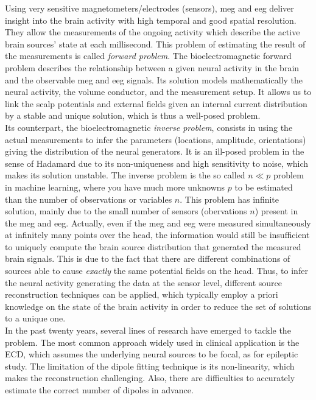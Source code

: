 Using very sensitive magnetometers/electrodes (sensors), \ac{meg} and \ac{eeg} deliver insight into the brain activity with high temporal and good spatial resolution. They allow the measurements of the ongoing activity which describe the active brain sources' state at each millisecond. This problem of estimating the result of the measurements is called \textit{forward problem}. The bioelectromagnetic forward problem describes the relationship between a given neural activity in the brain and the observable \ac{meg} and \ac{eeg} signals. Its solution models mathematically the neural activity, the volume conductor, and the measurement setup. It allows us to link the scalp potentials and external fields given an internal current distribution by a stable and unique solution, which is thus a well-posed problem. \\

Its counterpart, the bioelectromagnetic \textit{inverse problem}, consists in using the actual measurements to infer the parameters (locations, amplitude, orientations) giving the distribution of the neural generators. It is an ill-posed problem in the sense of Hadamard due to its non-uniqueness and high sensitivity to noise, which makes its solution unstable. The inverse problem is the so called $n \ll p$ problem in machine learning, where you have much more unknowns $p$ to be estimated than the number of observations or variables $n$. This problem has infinite solution, mainly due to the small number of sensors (obervations $n$) present in the \ac{meg} and \ac{eeg}. Actually, even if the \ac{meg} and \ac{eeg} were measured simultaneously at infinitely many points over the head, the information would still be insufficient to uniquely compute the brain source distribution that generated the measured brain signals. This is due to the fact that there are different combinations of sources able to cause \textit{exactly} the same potential fields on the head. Thus, to infer the neural activity generating the data at the sensor level, different source reconstruction techniques can be applied, which typically employ a priori knowledge on the state of the brain activity in order to reduce the set of solutions to a unique one.\\

In the past twenty years, several lines of research have emerged to tackle the problem. The most common approach widely used in clinical application is the \ac{ECD}, which assumes the underlying neural sources to be focal, as for epileptic study. The limitation of the dipole fitting technique is its non-linearity, which makes the reconstruction challenging. Also, there are difficulties to accurately estimate the correct number of dipoles in advance. \\

